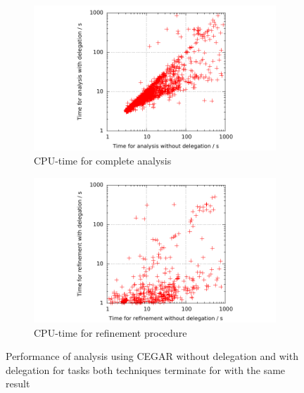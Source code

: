 \begin{figure}
\centering
\begin{subfigure}[b]{.48\textwidth}
\includegraphics[trim=2cm 0 1cm 0, clip=true, scale=0.9]{evaluation/sp_cputime_noDeleg_deleg}
\caption{CPU-time for complete analysis}
\label{fig:delegCputime}
\end{subfigure}
\begin{subfigure}[b]{.48\textwidth}
\includegraphics[trim=2cm 0 1cm 0, clip=true, scale=0.9]{evaluation/sp_refinetime_noDeleg_deleg}
\caption{CPU-time for refinement procedure}
\label{fig:delegRefinetime}
\end{subfigure}
\caption{Performance of analysis using CEGAR without delegation and with delegation for tasks both techniques terminate for with the same result}
\end{figure}

